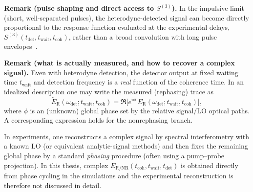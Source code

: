 \medskip

\textbf{Remark (pulse shaping and direct access to $S^{(3)}$).}
In the impulsive limit (short, well-separated pulses), the heterodyne-detected signal can become directly proportional to the response function evaluated at the experimental delays, $S^{(3)}(t_{\mathrm{det}},t_{\mathrm{wait}},t_{\mathrm{coh}})$, rather than a broad convolution with long pulse envelopes~\cite{mukamel1995principlesnonlinearoptical}.

\medskip

\textbf{Remark (what is actually measured, and how to recover a complex signal).}
Even with heterodyne detection, the detector output at fixed waiting time $t_{\mathrm{wait}}$ and detection frequency is a \emph{real} function of the coherence time. In an idealized description one may write the measured (rephasing) trace as
\begin{equation}
	\tilde{E}_{\mathrm{R}}(\omega_{\mathrm{det}};t_{\mathrm{wait}},t_{\mathrm{coh}})
	= \Re\big[ e^{i\phi}\,E_{\mathrm{R}}(\omega_{\mathrm{det}};t_{\mathrm{wait}},t_{\mathrm{coh}}) \big],
\end{equation}
where $\phi$ is an (unknown) global phase set by the relative signal/LO optical paths. A corresponding expression holds for the nonrephasing branch.

In experiments, one reconstructs a complex signal by spectral interferometry with a known LO (or equivalent analytic-signal methods) and then fixes the remaining global phase by a standard \emph{phasing} procedure (often using a pump--probe projection).
In this thesis, complex $E_{\mathrm{R/NR}}(t_{\mathrm{coh}},t_{\mathrm{wait}},t_{\mathrm{det}})$ is obtained directly from phase cycling in the simulations and the experimental reconstruction is therefore not discussed in detail.
